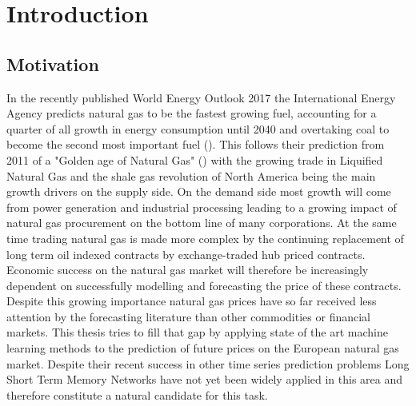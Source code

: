 \chapter{Introduction}
\section{Motivation}
In the recently published World Energy Outlook 2017 the International Energy Agency predicts natural gas to be the fastest growing fuel, accounting for a quarter of all growth in energy consumption until 2040 and overtaking coal to become the second most important fuel (\cite{iea_world_2017}). This follows their prediction from 2011 of a "Golden age of Natural Gas" (\cite{iea_world_2011}) with the growing trade in Liquified Natural Gas and the shale gas revolution of North America being the main growth drivers on the supply side. On the demand side most growth will come from power generation and industrial processing leading to a growing impact of natural gas procurement on the bottom line of many corporations.  At the same time trading natural gas is made more complex by the continuing replacement of long term oil indexed contracts by exchange-traded hub priced contracts. Economic success on the natural gas market will therefore be increasingly dependent on successfully modelling and forecasting the price of these contracts. Despite this growing importance natural gas prices have so far received less attention by the forecasting literature than other commodities or financial markets. This thesis tries to fill that gap by applying state of the art machine learning methods to the prediction of future prices on the European natural gas market. Despite their recent success in other time series prediction problems Long Short Term Memory Networks have not yet been widely applied in this area and therefore constitute a natural candidate for this task. 

